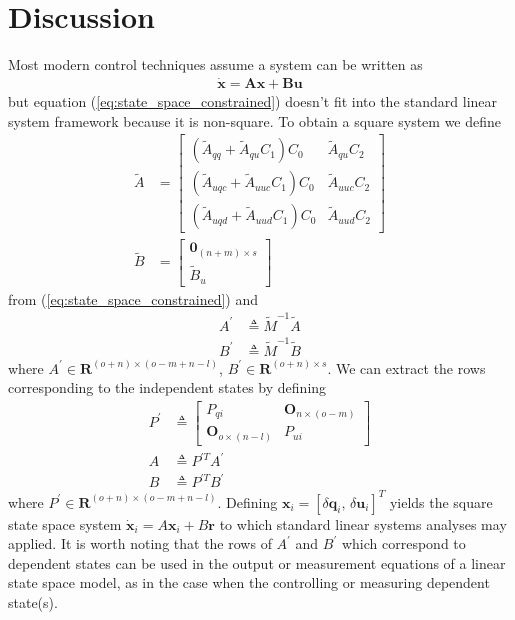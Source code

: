 \documentclass[smallcondensed,final]{svjour3}                     %
\begin{document}
\section{Discussion}
\label{sec:discussion}
Most modern control techniques assume a system can be written as
\begin{align}
\dot{\mathbf{x}} = \mathbf{A}\mathbf{x} + \mathbf{B}\mathbf{u}
\end{align}
but equation (\ref{eq:state_space_constrained}) doesn't fit into the standard
linear system framework because it is non-square.
To obtain a square system we define
\begin{align}
\tilde{A} &=
   \left[
     \begin{array}{cc}
       (\tilde{A}_{qq} + \tilde{A}_{qu} C_1 ) C_0 & \tilde{A}_{qu} C_2 \\
       (\tilde{A}_{uqc} + \tilde{A}_{uuc} C_1 ) C_0 & \tilde{A}_{uuc} C_2\\
       (\tilde{A}_{uqd} + \tilde{A}_{uud} C_1 ) C_0 & \tilde{A}_{uud} C_2
     \end{array}
   \right]\\
\tilde{B} &= 
    \left[
      \begin{array}{c}
        \bm{0}_{(n+m) \times s} \\
        \tilde{B}_{u}
      \end{array}
    \right]
\end{align}
from (\ref{eq:state_space_constrained}) and
\begin{align}
  \label{eq:A_prime}
    A^\prime &\triangleq \tilde{M}^{-1} \tilde{A} \\
  \label{eq:B_prime}
    B^\prime &\triangleq \tilde{M}^{-1} \tilde{B}
\end{align}
where  $A^\prime \in \bm{R}^{(o + n) \times (o - m + n -l)}$, $B^\prime \in
\bm{R}^{(o + n) \times s}$.  We can extract the rows corresponding to the
independent states by defining
\begin{align}
  \label{eq:P_prime}
    P^\prime &\triangleq \begin{bmatrix}
        P_{qi} & \bm{O}_{n \times (o - m)} \\
        \bm{O}_{o \times (n - l)} & P_{ui}
    \end{bmatrix} \\
  \label{eq:A}
    A &\triangleq P^{\prime T} A^\prime \\
  \label{eq:B}
    B &\triangleq P^{\prime T} B^\prime
\end{align}
where $P^\prime \in \bm{R}^{(o + n) \times (o - m + n - l)}$.  Defining
$\bm{x}_i = \left[\delta\bm{q}_i,\,\delta\bm{u}_i\right]^{T}$ yields the square
state space system $\dot{\bm{x}}_i = A \bm{x}_i + B \bm{r}$ to which standard
linear systems analyses may applied.  It is worth noting that the rows
of $A^\prime$ and $B^\prime$ which correspond to dependent states can be used
in the output or measurement equations of a linear state space model, as in the
case when the controlling or measuring dependent state(s).
\end{document}
